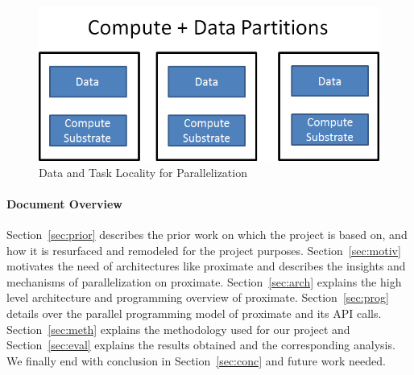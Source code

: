 \begin{figure}[h]
  \begin{center}
    \includegraphics[width=0.65\linewidth, height=2in]{cs758-figs/abstraction.png}
  \end{center}
\vspace{-0.2in}
  \caption{Data and Task Locality for Parallelization}
  \label{fig:abs}
\vspace{-0.4in}
\end{figure}


\paragraph{Document Overview}

Section~\ref{sec:prior} describes the prior work on which the project is based on, 
and how it is resurfaced and remodeled for the project purposes.
Section~\ref{sec:motiv} motivates the need of architectures like proximate and describes the
insights and mechanisms of parallelization on proximate. 
Section~\ref{sec:arch} explains the high level architecture and programming overview of proximate. 
Section~\ref{sec:prog} details over the parallel programming model of proximate and its API calls. 
Section~\ref{sec:meth} explains the methodology used for our project and Section~\ref{sec:eval} explains the results obtained and the corresponding analysis.
We finally end with conclusion in Section~\ref{sec:conc} and future work needed. 


